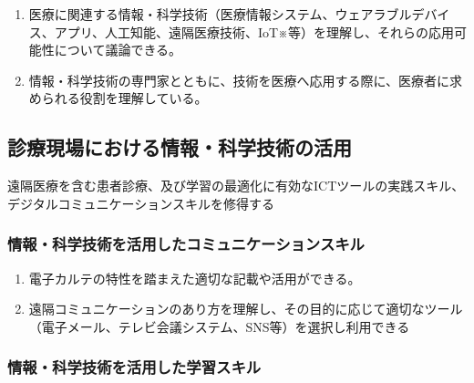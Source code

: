 \begin{enumerate}
\def\labelenumi{\arabic{enumi}.}
\tightlist
\item
  医療に関連する情報・科学技術（医療情報システム、ウェアラブルデバイス、アプリ、人工知能、遠隔医療技術、IoT※等）を理解し、それらの応用可能性について議論できる。
\item
  情報・科学技術の専門家とともに、技術を医療へ応用する際に、医療者に求められる役割を理解している。
\end{enumerate}

\hypertarget{ux8a3aux7642ux73feux5834ux306bux304aux3051ux308bux60c5ux5831ux79d1ux5b66ux6280ux8853ux306eux6d3bux7528}{%
\subsection{診療現場における情報・科学技術の活用}\label{ux8a3aux7642ux73feux5834ux306bux304aux3051ux308bux60c5ux5831ux79d1ux5b66ux6280ux8853ux306eux6d3bux7528}}

遠隔医療を含む患者診療、及び学習の最適化に有効なICTツールの実践スキル、デジタルコミュニケーションスキルを修得する

\hypertarget{ux60c5ux5831ux79d1ux5b66ux6280ux8853ux3092ux6d3bux7528ux3057ux305fux30b3ux30dfux30e5ux30cbux30b1ux30fcux30b7ux30e7ux30f3ux30b9ux30adux30eb}{%
\subsubsection{情報・科学技術を活用したコミュニケーションスキル}\label{ux60c5ux5831ux79d1ux5b66ux6280ux8853ux3092ux6d3bux7528ux3057ux305fux30b3ux30dfux30e5ux30cbux30b1ux30fcux30b7ux30e7ux30f3ux30b9ux30adux30eb}}

\begin{enumerate}
\def\labelenumi{\arabic{enumi}.}
\tightlist
\item
  電子カルテの特性を踏まえた適切な記載や活用ができる。
\item
  遠隔コミュニケーションのあり方を理解し、その目的に応じて適切なツール（電子メール、テレビ会議システム、SNS等）を選択し利用できる
\end{enumerate}

\hypertarget{ux60c5ux5831ux79d1ux5b66ux6280ux8853ux3092ux6d3bux7528ux3057ux305fux5b66ux7fd2ux30b9ux30adux30eb}{%
\subsubsection{情報・科学技術を活用した学習スキル}\label{ux60c5ux5831ux79d1ux5b66ux6280ux8853ux3092ux6d3bux7528ux3057ux305fux5b66ux7fd2ux30b9ux30adux30eb}}

